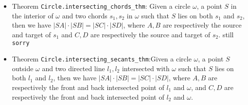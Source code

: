 \documentclass[12pt]{amsart}
\begin{document}
\begin{itemize}
    \item Theorem \verb|Circle.intersecting_chords_thm|: Given a circle $\omega$, a point $S$ in the interior of $\omega$ and two chords $s_1,s_2$ in $\omega$ such that $S$ lies on both $s_1$ and $s_2$, then we have $|SA|\cdot|SB|=|SC|\cdot|SD|$, where $A,B$ are respectively the source and target of $s_1$ and $C,D$ are respectively the source and target of $s_2$. {\color{red} still \verb|sorry|}
    \item Theorem \verb|Circle.intersecting_secants_thm|:Given a circle $\omega$, a point $S$ outside $\omega$ and two directed line $l_1,l_2$ intersected with $\omega$ such that $S$ lies on both $l_1$ and $l_2$, then we have $|SA|\cdot|SB|=|SC|\cdot|SD|$, where $A,B$ are respectively the front and back intersected point of $l_1$ and $\omega$, and $C,D$ are respectively the front and back intersected point of $l_2$ and $\omega$.
\end{itemize}
\end{document}
